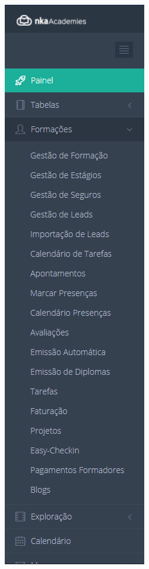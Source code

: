 \begin{center}
        \includegraphics[width=\textwidth,height=0.5\textheight,keepaspectratio]{images/funcionalidades.png}
        \label{fig:funcproduto}
\end{center}

